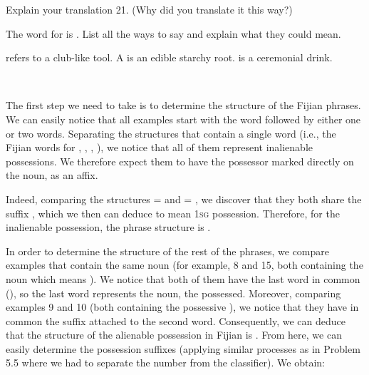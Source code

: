 \begin{refsection}
\begin{problem}{\langnameFijian}{\nameVPapp}{}
\begin{assgts}
\item Explain your translation 21. (Why did you translate it this way?)
\item The word for  is . List all the ways to say  and explain what they could mean. 
\end{assgts}

\begin{tblsWarning}
 refers to a club-like tool. A  is an edible starchy root.  is a ceremonial drink. 

\explainsgdupl\ \explainincl
\end{tblsWarning}
\end{problem}
\begin{mysolution}

 The first step we need to take is to determine the structure of the Fijian phrases. We can easily notice that all examples start with the word  followed by either one or two words. Separating the structures that contain a single word (i.e., the Fijian words for , , , ), we notice that all of them represent inalienable possessions. We therefore expect them to have the possessor marked directly on the noun, as an affix.

 Indeed, comparing the structures  =  and  = , we discover that they both share the suffix , which we then can deduce to mean 1\textsc{sg} possession. Therefore, for the inalienable possession, the phrase structure is .

 In order to determine the structure of the rest of the phrases, we compare examples that contain the same noun (for example, 8 and 15, both containing the noun which means ). We notice that both of them have the last word in common (), so the last word represents the noun, the possessed. Moreover, comparing examples 9 and 10 (both containing the possessive ), we notice that they have in common the suffix  attached to the second word. Consequently, we can deduce that the structure of the alienable possession in Fijian is . From here, we can easily determine the possession suffixes (applying similar processes as in Problem 5.5 where we had to separate the number from the classifier). We obtain:



\end{mysolution}
\end{refsection}
